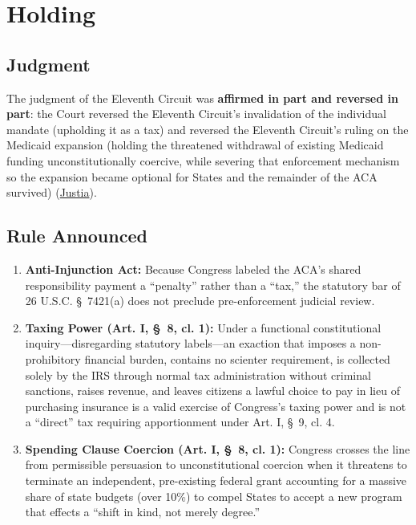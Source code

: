 \documentclass[12pt]{article}
\begin{document}
\section{Holding}
\subsection{Judgment}
The judgment of the Eleventh Circuit was \textbf{affirmed in part and reversed in part}: the Court reversed the Eleventh Circuit's invalidation of the individual mandate (upholding it as a tax) and reversed the Eleventh Circuit's ruling on the Medicaid expansion (holding the threatened withdrawal of existing Medicaid funding unconstitutionally coercive, while severing that enforcement mechanism so the expansion became optional for States and the remainder of the ACA survived) (\href{https://supreme.justia.com/cases/federal/us/567/519/}{Justia}).

\subsection{Rule Announced}
\begin{enumerate}
\item \textbf{Anti-Injunction Act:} Because Congress labeled the ACA's shared responsibility payment a ``penalty'' rather than a ``tax,'' the statutory bar of 26 U.S.C. \S~7421(a) does not preclude pre-enforcement judicial review.
\item \textbf{Taxing Power (Art. I, \S~8, cl. 1):} Under a functional constitutional inquiry---disregarding statutory labels---an exaction that imposes a non-prohibitory financial burden, contains no scienter requirement, is collected solely by the IRS through normal tax administration without criminal sanctions, raises revenue, and leaves citizens a lawful choice to pay in lieu of purchasing insurance is a valid exercise of Congress's taxing power and is not a ``direct'' tax requiring apportionment under Art. I, \S~9, cl. 4.
\item \textbf{Spending Clause Coercion (Art. I, \S~8, cl. 1):} Congress crosses the line from permissible persuasion to unconstitutional coercion when it threatens to terminate an independent, pre-existing federal grant accounting for a massive share of state budgets (over 10\%) to compel States to accept a new program that effects a ``shift in kind, not merely degree.''
\end{enumerate}
\end{document}
